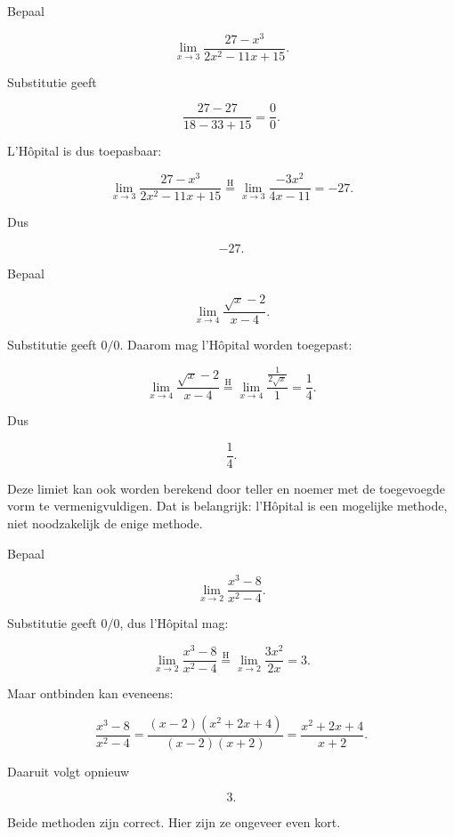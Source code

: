 \documentclass{ximera}
\begin{document}


\begin{voorbeeld}
Bepaal

\[\lim_{x\to3}\frac{27-x^3}{2x^2-11x+15}.\]

Substitutie geeft

\[\frac{27-27}{18-33+15}=\frac00.\]

L'Hôpital is dus toepasbaar:

\[
\lim_{x\to3}\frac{27-x^3}{2x^2-11x+15}
\overset{\mathrm H}{=}
\lim_{x\to3}\frac{-3x^2}{4x-11}
=-27.
\]

Dus

\[\boxed{-27}.\]
\end{voorbeeld}

\begin{voorbeeld}
Bepaal

\[\lim_{x\to4}\frac{\sqrt{x}-2}{x-4}.\]

Substitutie geeft \(0/0\). Daarom mag l'Hôpital worden toegepast:

\[
\lim_{x\to4}\frac{\sqrt{x}-2}{x-4}
\overset{\mathrm H}{=}
\lim_{x\to4}\frac{\frac{1}{2\sqrt{x}}}{1}
=\frac14.
\]

Dus

\[\boxed{\frac14}.\]

Deze limiet kan ook worden berekend door teller en noemer met de
toegevoegde vorm te vermenigvuldigen. Dat is belangrijk: l'Hôpital is
een mogelijke methode, niet noodzakelijk de enige methode.
\end{voorbeeld}

\begin{voorbeeld}
Bepaal

\[\lim_{x\to2}\frac{x^3-8}{x^2-4}.\]

Substitutie geeft \(0/0\), dus l'Hôpital mag:

\[
\lim_{x\to2}\frac{x^3-8}{x^2-4}
\overset{\mathrm H}{=}
\lim_{x\to2}\frac{3x^2}{2x}
=3.
\]

Maar ontbinden kan eveneens:

\[
\frac{x^3-8}{x^2-4}
=
\frac{(x-2)(x^2+2x+4)}{(x-2)(x+2)}
=
\frac{x^2+2x+4}{x+2}.
\]

Daaruit volgt opnieuw

\[\boxed{3}.\]

Beide methoden zijn correct. Hier zijn ze ongeveer even kort.
\end{voorbeeld}
\end{document}
